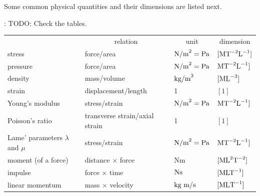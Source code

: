 \documentclass[graybox,envcountchap,sectrefs,final]{svmonodo}
\newcommand{\shortinlinecomment}[3]{{\color{red}{\bf #1}: #2}}
\begin{document}
\noindent
Some common physical quantities and their dimensions are listed next.

\shortinlinecomment{hpl 2}{ TODO: Check the tables. }{ TODO: Check the tables. }



{\small   %

\vspace{4mm}

\begin{tabular}{llll}
\hline\noalign{\smallskip}
\multicolumn{1}{c}{ Quantity } & \multicolumn{1}{c}{ relation } & \multicolumn{1}{c}{ unit } & \multicolumn{1}{c}{ dimension } \\
\noalign{\smallskip}\svhline\noalign{\smallskip}
stress                               & force/area                               & $\hbox{N/m}^2 = \hbox{Pa}$     & $[\hbox{M}\hbox{T}^{-2}\hbox{L}^{-1}]$  \\
pressure                             & force/area                               & $\hbox{N/m}^2 = \hbox{Pa}$     & $\hbox{M}\hbox{T}^{-2}\hbox{L}^{-1}]$   \\
density                              & mass/volume                              & $\hbox{kg/m}^3$                & $[\hbox{ML}^{-3}]$                      \\
strain                               & displacement/length                      & 1                              & $[1]$                                   \\
Young's modulus                      & stress/strain                            & $\hbox{N/m}^2 = \hbox{Pa}$     & $\hbox{M}\hbox{T}^{-2}\hbox{L}^{-1}]$   \\
Poisson's ratio                      & transverse strain/axial strain           & 1                              & $[1]$                                   \\
Lame' parameters $\lambda$ and $\mu$ & stress/strain                            & $\hbox{N/m}^2 = \hbox{Pa}$     & $\hbox{M}\hbox{T}^{-2}\hbox{L}^{-1}]$   \\
moment (of a force)                  & distance $\times$ force                  & Nm                             & $[\hbox{ML}^2\hbox{T}^{-2}]$            \\
impulse                              & force $\times$ time                      & $\hbox{Ns}$                    & $[\hbox{MLT}^{-1}]$                     \\
linear momentum                      & mass $\times$ velocity                   & $\hbox{kg m/s}$                & $[\hbox{ML}\hbox{T}^{-1}]$              \\

\end{tabular}}
\end{document}
